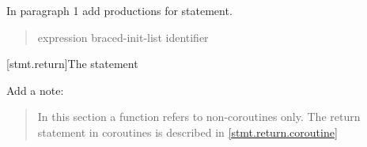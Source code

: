 In paragraph 1 add productions for  statement.

\begin{quote}
\begin{bnf}
	\br
	\br
	\br
	 expression\opt \terminal{;}\br
	 braced-init-list \terminal{;}\br
	\br
	\br
	 identifier \terminal{;}
\end{bnf}
\end{quote}

\setcounter{subsection}{2}
[stmt.return]{The  statement}%
%
%

Add a note:

\begin{quote}
\enternote
In this section a function refers to non-coroutines only.
The return statement in coroutines is described in \ref{stmt.return.coroutine}
\exitnote
\end{quote}

